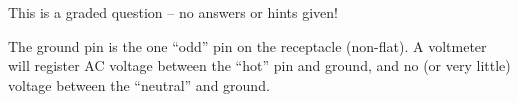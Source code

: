 \vfil 

\eject






This is a graded question -- no answers or hints given!







The ground pin is the one ``odd'' pin on the receptacle (non-flat).  A voltmeter will register AC voltage between the ``hot'' pin and ground, and no (or very little) voltage between the ``neutral'' and ground.




